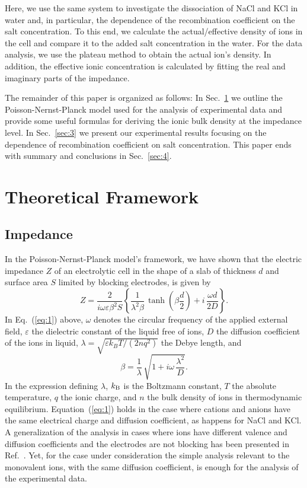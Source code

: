 \documentclass[preprint,aps,pre]{revtex4}
\begin{document}
Here, we use the same system to investigate the dissociation of NaCl and KCl in water and, in particular, the dependence of the recombination coefficient on the salt concentration. To this end, we calculate the actual/effective density of ions in the cell and compare it to the added salt concentration in the water. For the data analysis, we use the plateau method to obtain the actual ion's density. In addition, the effective ionic concentration is calculated by fitting the real and imaginary parts of the impedance.

The remainder of this paper is organized as follows: In Sec.~\ref{sec:2} we outline the Poisson-Nernst-Planck model used for the analysis of experimental data and provide some useful formulas for deriving the ionic bulk density at the impedance level. In Sec.~\ref{sec:3} we present our experimental results focusing on the dependence of recombination coefficient on salt concentration. This paper ends with summary and conclusions in Sec.~\ref{sec:4}.

\section{Theoretical Framework}
\label{sec:2}

\subsection{Impedance}
\label{subsec:2a}

In the Poisson-Nernst-Planck model's framework, we have shown that the electric impedance $Z$ of an electrolytic cell in the shape of a slab of thickness $d$ and surface area $S$ limited by blocking electrodes, is given by~\cite{alai}
\begin{equation}
\label{eq:1}Z=\frac{2}{i \omega \varepsilon \beta^2 S}\left\{\frac{1}{\lambda^2 \beta}\,\tanh\left(\beta \frac{d}{2}\right)+i\,\frac{\omega d}{2 D}\right\}.
\end{equation}
In Eq.~(\ref{eq:1}) above, $\omega$ denotes the circular frequency of the applied external field, $\varepsilon$ the dielectric constant of the liquid free of ions, $D$ the diffusion coefficient of the ions in liquid,
$\lambda=\sqrt{\varepsilon k_BT/(2 n q^2)}$ the Debye length, and
\begin{equation}
\label{eq:2}\beta=\frac{1}{\lambda}\,\sqrt{1+i \omega \,\frac{\lambda^2}{D}}.
\end{equation}
In the expression defining $\lambda$, $k_{\rm B}$ is the Boltzmann constant, $T$ the absolute temperature, $q$ the ionic charge, and $n$ the bulk density of ions in thermodynamic equilibrium. Equation~(\ref{eq:1}) holds in the case where cations and anions have the same electrical charge and diffusion coefficient, as happens for NaCl and KCl. A generalization of the analysis in cases where ions have different valence and diffusion coefficients and the electrodes are not blocking has been presented in Ref.~\cite{antonova}. Yet, for the case under consideration the simple analysis relevant to the monovalent ions, with the same diffusion coefficient, is enough for the analysis of the experimental data.
\end{document}
